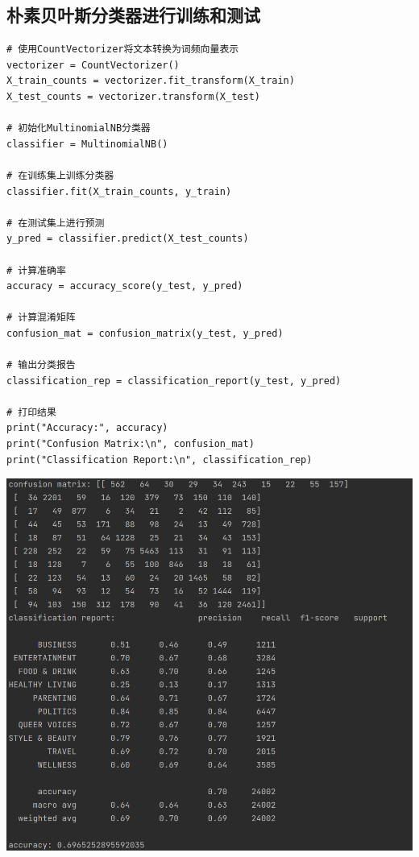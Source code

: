\documentclass{article}
\begin{document}
\subsection{朴素贝叶斯分类器进行训练和测试}
\begin{lstlisting}
# 使用CountVectorizer将文本转换为词频向量表示
vectorizer = CountVectorizer()
X_train_counts = vectorizer.fit_transform(X_train)
X_test_counts = vectorizer.transform(X_test)

# 初始化MultinomialNB分类器
classifier = MultinomialNB()

# 在训练集上训练分类器
classifier.fit(X_train_counts, y_train)

# 在测试集上进行预测
y_pred = classifier.predict(X_test_counts)

# 计算准确率
accuracy = accuracy_score(y_test, y_pred)

# 计算混淆矩阵
confusion_mat = confusion_matrix(y_test, y_pred)

# 输出分类报告
classification_rep = classification_report(y_test, y_pred)

# 打印结果
print("Accuracy:", accuracy)
print("Confusion Matrix:\n", confusion_mat)
print("Classification Report:\n", classification_rep)
\end{lstlisting}
\begin{center}
    \includegraphics[width=1\linewidth]{1.png}
\end{center}
\end{document}
